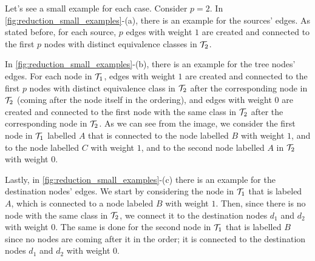 \begin{example}[Edges]
    Let's see a small example for each case. Consider $p=2$. In \cref{fig:reduction_small_examples}-(a), there is an example for the sources' edges. As stated before, for each source, $p$ edges with weight $1$ are created and connected to the first $p$ nodes with distinct equivalence classes in $\mathcal{T}_{2}$.

    In \cref{fig:reduction_small_examples}-(b), there is an example for the tree nodes' edges. For each node in $\mathcal{T}_{1}$, edges with weight $1$ are created and connected to the first $p$ nodes with distinct equivalence class in $\mathcal{T}_{2}$ after the corresponding node in $\mathcal{T}_{2}$ (coming after the node itself in the ordering), and edges with weight $0$ are created and connected to the first node with the same class in $\mathcal{T}_{2}$ after the corresponding node in $\mathcal{T}_{2}$. As we can see from the image, we consider the first node in $\mathcal{T}_{1}$ labelled $A$ that is connected to the node labelled $B$ with weight $1$, and to the node labelled $C$ with weight $1$, and to the second node labelled $A$ in $\mathcal{T}_{2}$ with weight $0$.

    Lastly, in \cref{fig:reduction_small_examples}-(c) there is an example for the destination nodes' edges. We start by considering the node in $\mathcal{T}_{1}$ that is labeled $A$, which is connected to a node labeled $B$ with weight $1$. Then, since there is no node with the same class in $\mathcal{T}_{2}$, we connect it to the destination nodes $d_1$ and $d_2$ with weight $0$. The same is done for the second node in $\mathcal{T}_{1}$ that is labelled $B$ since no nodes are coming after it in the order; it is connected to the destination nodes $d_1$ and $d_2$ with weight $0$.

    \begin{figure}[H]
        \centering
        \begin{subfigure}[b]{0.3\textwidth}
            \centering
\end{subfigure}
\end{figure}
\end{example}
